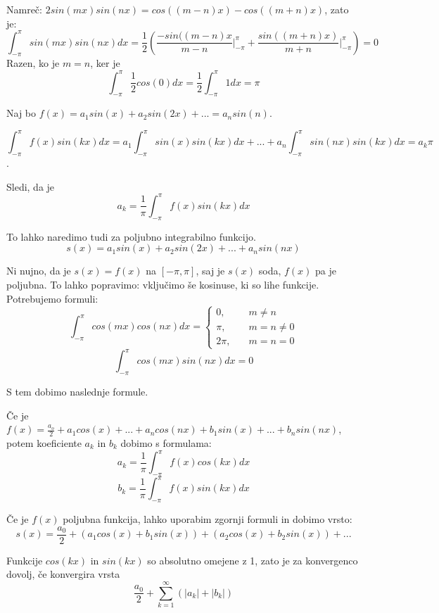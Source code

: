 \documentclass[11pt, a4paper]{article}
\begin{document}
    Namreč: \(2 sin(mx) sin(nx) = cos((m-n)x) - cos((m+n)x)\), zato je:
    \[\int_{- \pi}^{\pi} sin(mx) sin(nx) dx = \frac{1}{2} (\frac{-sin((m-n)x}{m-n} \Big |_{- \pi}^{\pi} + \frac{sin((m+n)x)}{m+n} \Big |_{- \pi}^{\pi}) = 0\]
    Razen, ko je \(m = n\), ker je 
    \[\displaystyle \int_{- \pi}^{\pi} \frac{1}{2} cos(0)dx = \frac{1}{2} \int_{- \pi}^{\pi} 1 dx = \pi\]
    
    \par
    Naj bo \(f(x) = a_1 sin(x) + a_2 sin(2x) + ... = a_n sin(n)\).

    \[\displaystyle \int_{- \pi}^{\pi} f(x) sin(kx) dx = a_1 \int_{- \pi}^{\pi} sin(x) sin(kx) dx + ... + a_n \int_{- \pi}^{\pi} sin(nx) sin(kx) dx = a_k \pi\].

    Sledi, da je 
    \[a_k = \frac{1}{\pi} \int_{- \pi}^{\pi} f(x) sin(kx) dx\]

    To lahko naredimo tudi za poljubno integrabilno funkcijo.
    \[s(x) = a_1 sin(x) + a_2 sin(2x) + ... + a_n sin(nx)\]

    Ni nujno, da je \(s(x) = f(x)\) na \([- \pi, \pi]\), saj je \(s(x)\) soda, \(f(x)\) pa je poljubna. To lahko popravimo: vključimo še kosinuse, ki so lihe funkcije. Potrebujemo formuli:
    \[
        \int_{- \pi}^{\pi} cos(mx) cos(nx) dx = 
        \begin{cases}
            0, & \quad{m \neq n} \\
            \pi, & \quad{m = n \neq 0} \\
            2 \pi, & \quad{m = n = 0}
        \end{cases}
    \]
    \[
        \int_{- \pi}^{\pi} cos(mx) sin(nx) dx = 0
    \]
    
    S tem dobimo naslednje formule.
    \begin{theorem}
        Če je \(f(x) = \frac{a_o}{2} + a_1 cos(x) + ... + a_n cos(nx) + b_1 sin(x) + ... + b_n sin(nx) \), potem koeficiente \(a_k\) in \(b_k\) dobimo s formulama:
        \[a_k = \frac{1}{\pi} \int_{- \pi}^{\pi} f(x) cos(kx) dx\]
        \[b_k = \frac{1}{\pi} \int_{- \pi}^{\pi} f(x) sin(kx) dx\]
    \end{theorem}

    \begin{theorem}
        Če je \(f(x)\) poljubna funkcija, lahko uporabim zgornji formuli in dobimo vrsto:
        \[s(x) = \frac{a_0}{2} + (a_1 cos(x) + b_1 sin(x)) + (a_2 cos(x) + b_2 sin(x)) + ...\]
    \end{theorem}

    Funkcije \(cos(kx)\) in \(sin(kx)\) so absolutno omejene z 1, zato je za konvergenco dovolj, če konvergira vrsta 
    \[\frac{a_0}{2} + \sum_{k=1}^{\infty} (|a_k| + |b_k|)\]
\end{document}
